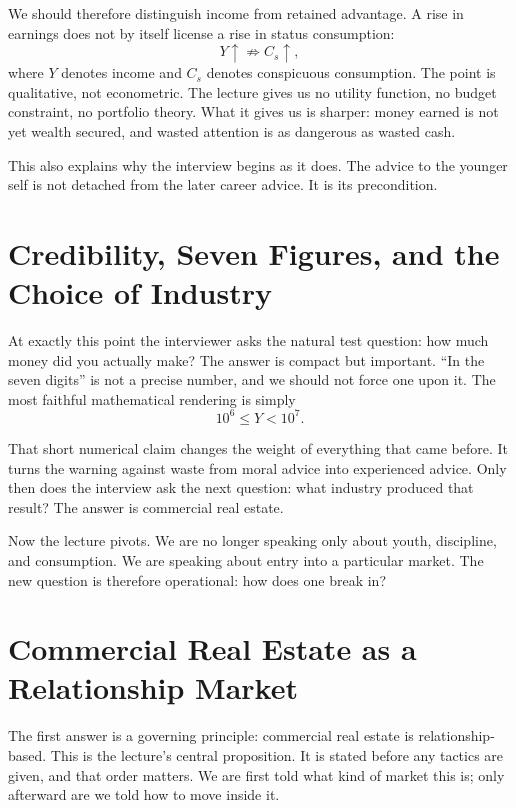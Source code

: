 We should therefore distinguish income from retained advantage. A rise in earnings does not by itself license a rise in status consumption:
\begin{equation}
Y \uparrow \not\Rightarrow C_s \uparrow,
\end{equation}
where \(Y\) denotes income and \(C_s\) denotes conspicuous consumption. The point is qualitative, not econometric. The lecture gives us no utility function, no budget constraint, no portfolio theory. What it gives us is sharper: money earned is not yet wealth secured, and wasted attention is as dangerous as wasted cash.

This also explains why the interview begins as it does. The advice to the younger self is not detached from the later career advice. It is its precondition.

\section{Credibility, Seven Figures, and the Choice of Industry}

At exactly this point the interviewer asks the natural test question: how much money did you actually make? The answer is compact but important. ``In the seven digits'' is not a precise number, and we should not force one upon it. The most faithful mathematical rendering is simply
\begin{equation}
10^6 \le Y < 10^7.
\end{equation}

That short numerical claim changes the weight of everything that came before. It turns the warning against waste from moral advice into experienced advice. Only then does the interview ask the next question: what industry produced that result? The answer is commercial real estate.

Now the lecture pivots. We are no longer speaking only about youth, discipline, and consumption. We are speaking about entry into a particular market. The new question is therefore operational: how does one break in?

\section{Commercial Real Estate as a Relationship Market}

The first answer is a governing principle: commercial real estate is relationship-based. This is the lecture's central proposition. It is stated before any tactics are given, and that order matters. We are first told what kind of market this is; only afterward are we told how to move inside it.

